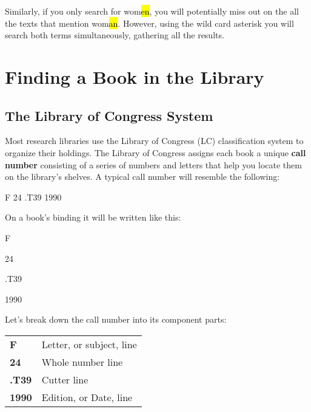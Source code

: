 Similarly, if you only search for wom\hl{en}, you will potentially miss out on the
all the texts that mention wom\hl{an}. However, using the wild card
asterisk you will search both terms simultaneously, gathering all the results.

\section{Finding a Book in the Library}

\subsection{The Library of Congress System} Most research libraries use the
Library of Congress (LC) classification system to organize their holdings. The
Library of Congress assigns each book a unique \textbf{call number} consisting
of a series of numbers and letters that help  you locate them on the library's
shelves. A typical call number will resemble  the following:

\begin{center}
\bigskip

{\huge F 24 .T39 1990}
\end{center}

\bigskip

On a book's binding it will be written like this:

\begin{center}
{\huge F} \smallskip

{\huge 24}\smallskip

{\huge .T39}\smallskip

{\huge 1990}

\end{center}

\noindent Let's break down the call number into its component parts:

\bigskip

{\large
\begin{center}
\begin{tabular}{ ll }    \textbf{F} & Letter, or
subject, line \\    \textbf{24} & Whole number line \\     \textbf{.T39} & Cutter
line \\   \textbf{1990} & Edition, or Date, line\\  \end{tabular}
\end{center}
}
\medskip


